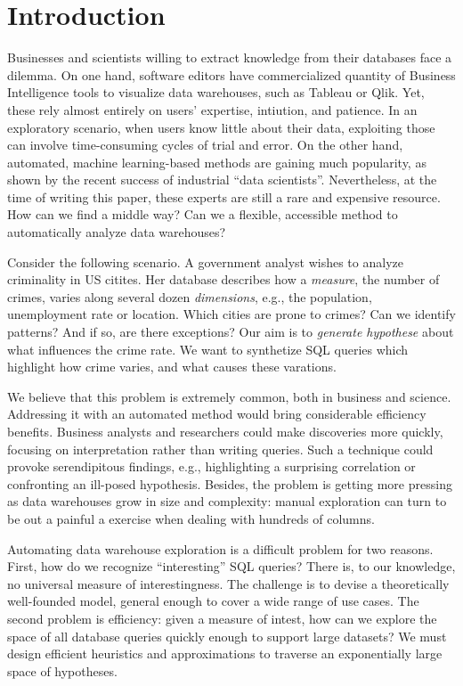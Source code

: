 \section{Introduction}
\label{sec:intro}

Businesses and scientists willing to extract knowledge from their databases
face a dilemma. On one hand, software editors have commercialized quantity of
Business Intelligence tools to visualize data warehouses, such as Tableau or
Qlik. Yet, these rely almost entirely on users' expertise, intiution, and
patience. In an exploratory scenario, when users know little about their data,
exploiting those can involve time-consuming cycles of trial and error. On the
other hand, automated, machine learning-based methods are gaining much
popularity, as shown by the recent success of industrial ``data
scientists''. Nevertheless, at the time of writing this paper, these experts
are still a rare and expensive resource. How can we find a middle way? Can we
a flexible, accessible method to automatically analyze data warehouses?

Consider the following scenario. A government analyst wishes to analyze
criminality in US citites. Her database describes how a \emph{measure}, the
number of crimes, varies along several dozen \emph{dimensions}, e.g., the
population, unemployment rate or location. Which cities are prone to crimes?
Can we identify patterns? And if so, are there exceptions? Our aim is to
\emph{generate hypothese} about what influences the crime rate. We want to
synthetize SQL queries which highlight how crime varies, and what causes these
varations.

We believe that this problem is extremely common, both in business and science.
Addressing it with an automated method would bring considerable efficiency
benefits. Business analysts and researchers could make discoveries more
quickly, focusing on interpretation rather than writing queries. Such a
technique could provoke serendipitous findings, e.g., highlighting a surprising
correlation or confronting an ill-posed hypothesis.  Besides, the problem is
getting more pressing as data warehouses grow in size and complexity: manual
exploration can turn to be out a painful a exercise when dealing with hundreds
of columns.

Automating data warehouse exploration is a difficult problem for
two reasons.  First, how do we recognize ``interesting'' SQL queries?  There
is, to our knowledge, no universal measure of interestingness. The challenge is
to devise a theoretically well-founded model, general enough to cover a wide
range of use cases. The second problem is efficiency: given a measure of
intest, how can we explore the space of all database queries quickly enough to
support large datasets? We must design efficient heuristics and approximations
to traverse an exponentially large space of hypotheses.

